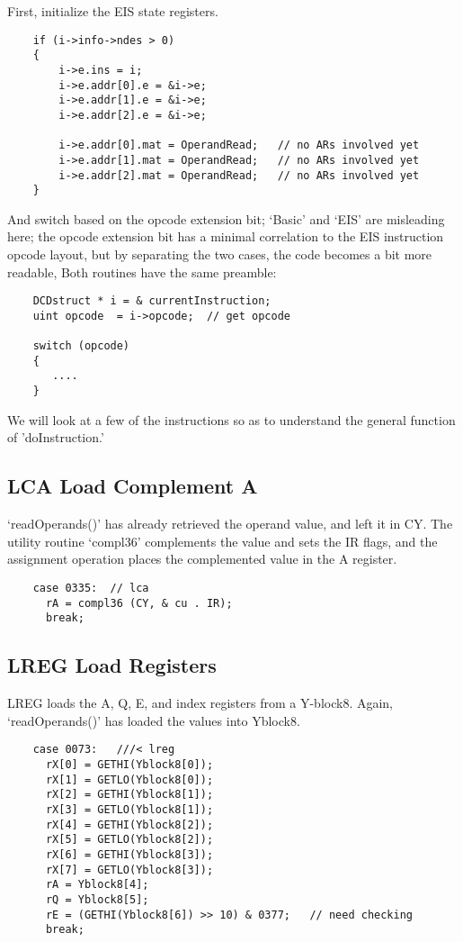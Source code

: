 \documentclass[notitlepage]{report}
\begin{document}
First, initialize the EIS state registers.

\begin{verbatim}
    if (i->info->ndes > 0)
    {
        i->e.ins = i;
        i->e.addr[0].e = &i->e;
        i->e.addr[1].e = &i->e;
        i->e.addr[2].e = &i->e;

        i->e.addr[0].mat = OperandRead;   // no ARs involved yet
        i->e.addr[1].mat = OperandRead;   // no ARs involved yet
        i->e.addr[2].mat = OperandRead;   // no ARs involved yet
    }
\end{verbatim}

And switch based on the opcode extension bit; `Basic' and `EIS' are
misleading here; the opcode extension bit has a minimal correlation to
the EIS instruction opcode layout, but by separating the two cases,
the code becomes a bit more readable, Both routines have the same
preamble:

\begin{verbatim}
    DCDstruct * i = & currentInstruction;
    uint opcode  = i->opcode;  // get opcode

    switch (opcode)
    {
       ....
    }
\end{verbatim}

We will look at a few of the instructions so as to understand the
general function of 'doInstruction.'

\subsection{LCA Load Complement A}

`readOperands()' has already retrieved the operand value, and left it in CY.
The utility routine `compl36' complements the value and sets the IR flags,
and the assignment operation places the complemented value in the A register.

\begin{verbatim}
    case 0335:  // lca
      rA = compl36 (CY, & cu . IR);
      break;
\end{verbatim}

\subsection{LREG Load Registers}

LREG loads the A, Q, E, and index registers from a Y-block8. Again, 
`readOperands()' has loaded the values into Yblock8.

\begin{verbatim}
    case 0073:   ///< lreg
      rX[0] = GETHI(Yblock8[0]);
      rX[1] = GETLO(Yblock8[0]);
      rX[2] = GETHI(Yblock8[1]);
      rX[3] = GETLO(Yblock8[1]);
      rX[4] = GETHI(Yblock8[2]);
      rX[5] = GETLO(Yblock8[2]);
      rX[6] = GETHI(Yblock8[3]);
      rX[7] = GETLO(Yblock8[3]);
      rA = Yblock8[4];
      rQ = Yblock8[5];
      rE = (GETHI(Yblock8[6]) >> 10) & 0377;   // need checking
      break;
\end{verbatim}
\end{document}
